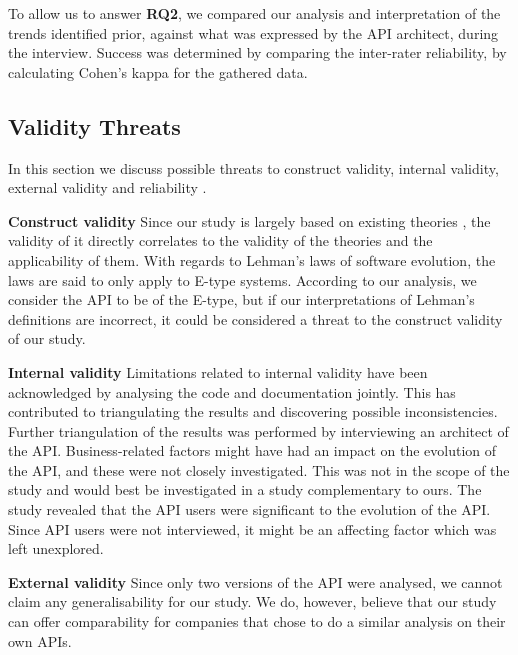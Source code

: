 \documentclass{sig-alternate}
\begin{document}
\newpage
To allow us to answer \textbf{RQ2}, we compared our analysis and interpretation of the trends identified prior, against what was expressed by the API architect, during the interview. Success was determined by comparing the inter-rater reliability, by calculating Cohen's kappa \cite{cohen1968weighted} for the gathered data. 





\subsection{Validity Threats} \label{validity_threats} 
In this section we discuss possible threats to construct validity, internal validity, external validity and reliability \cite{runeson2009guidelines}.

\smallskip \noindent
\textbf{Construct validity  } Since our study is largely based on existing theories \cite{chapin2001types, lehman90sview}, the validity of it directly correlates to the validity of the theories and the applicability of them. With regards to Lehman's laws of software evolution, the laws are said to only apply to E-type systems. According to our analysis, we consider the API to be of the E-type, but if our interpretations of Lehman's definitions are incorrect, it could be considered a threat to the construct validity of our study. 

\smallskip \noindent
\textbf{Internal validity  } Limitations related to internal validity have been acknowledged by analysing the code and documentation jointly. This has contributed to triangulating the results and discovering possible inconsistencies. Further triangulation of the results was performed by interviewing an architect of the API. Business-related factors might have had an impact on the evolution of the API, and these were not closely investigated. This was not in the scope of the study and would best be investigated in a study complementary to ours. The study revealed that the API users were significant to the evolution of the API. Since API users were not interviewed, it might be an affecting factor which was left unexplored. 

\smallskip \noindent
\textbf{External validity  } Since only two versions of the API were analysed, we cannot claim any generalisability for our study. We do, however, believe that our study can offer comparability for companies that chose to do a similar analysis on their own APIs. 
\end{document}
